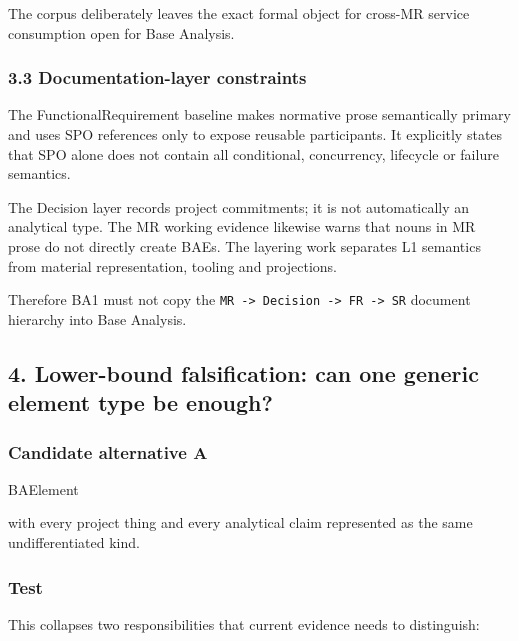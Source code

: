 \documentclass[
]{article}
\newenvironment{Shaded}{}{}
\newcommand{\NormalTok}[1]{#1}
\begin{document}
The corpus deliberately leaves the exact formal object for cross-MR
service consumption open for Base Analysis.

\subsubsection{3.3 Documentation-layer
constraints}\label{33-documentation-layer-constraints}

The FunctionalRequirement baseline makes normative prose semantically
primary and uses SPO references only to expose reusable participants. It
explicitly states that SPO alone does not contain all conditional,
concurrency, lifecycle or failure semantics.

The Decision layer records project commitments; it is not automatically
an analytical type. The MR working evidence likewise warns that nouns in
MR prose do not directly create BAEs. The layering work separates L1
semantics from material representation, tooling and projections.

Therefore BA1 must not copy the
\texttt{MR\ -\textgreater{}\ Decision\ -\textgreater{}\ FR\ -\textgreater{}\ SR}
document hierarchy into Base Analysis.

\subsection{4. Lower-bound falsification: can one generic element type
be
enough?}\label{4-lower-bound-falsification-can-one-generic-element-type-be-enough}

\subsubsection{Candidate alternative A}\label{candidate-alternative-a}

\begin{Shaded}
\begin{Highlighting}[]
\NormalTok{BAElement}
\end{Highlighting}
\end{Shaded}

with every project thing and every analytical claim represented as the
same undifferentiated kind.

\subsubsection{Test}\label{test}

This collapses two responsibilities that current evidence needs to
distinguish:
\end{document}
